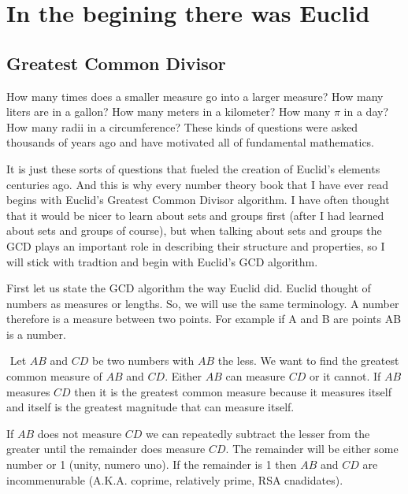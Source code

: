 \chapter{In the begining there was Euclid}

\section{Greatest Common Divisor}

How many times does a smaller measure go into a larger measure?
How many liters are in a gallon? How many meters in a kilometer?
How many $\pi$ in a day? How many radii in a circumference? These kinds of
questions were asked thousands of years ago and have motivated all of fundamental
mathematics.

It is just these sorts of questions that fueled the creation of Euclid's
elements centuries ago. And this is why every number theory book that I have
ever read begins with Euclid's Greatest Common Divisor algorithm. I have often
thought that it would be nicer to learn about sets and groups first (after
I had learned about sets and groups of course), but 
when talking about sets and groups the GCD plays an important role in describing
their structure and properties, so I will stick with tradtion and begin with
Euclid's GCD algorithm.

First let us state the GCD algorithm the way Euclid did. Euclid thought of 
numbers as measures or lengths. So, we will use the same terminology. A 
number therefore is a measure between two points. For example if A and B
are points AB is a number.

\begin{proposition}
$ $\newline
Let $AB$ and $CD$ be two numbers with $AB$ the less. We want to find the greatest
common measure of $AB$ and $CD$. Either $AB$ can measure $CD$ or it cannot. If
$AB$ measures $CD$ then it is the greatest common measure because it measures
itself and itself is the greatest magnitude that can measure itself.

If $AB$ does not measure $CD$ we can repeatedly subtract the lesser from 
the greater until the remainder does measure $CD$. The remainder will be either
some number or 1 (unity, numero uno). If the remainder is 1 then $AB$ and $CD$
are incommenurable (A.K.A. coprime, relatively prime, RSA cnadidates).

\end{proposition}

